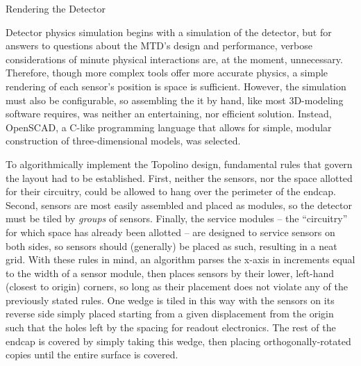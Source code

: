 \begin{section}{Rendering the Detector}

Detector physics simulation begins with a simulation of the detector, but for answers to questions about the MTD's design and performance, verbose considerations of minute physical interactions are, at the moment, unnecessary. Therefore, though more complex tools offer more accurate physics, a simple rendering of each sensor's position is space is sufficient. However, the simulation must also be configurable, so assembling the it by hand, like most 3D-modeling software requires, was neither an entertaining, nor efficient solution. Instead, OpenSCAD, a C-like programming language that allows for simple, modular construction of three-dimensional models, was selected.

To algorithmically implement the Topolino design, fundamental rules that govern the layout had to be established. First, neither the sensors, nor the space allotted for their circuitry, could be allowed to hang over the perimeter of the endcap. Second, sensors are most easily assembled and placed as modules, so the detector must be tiled by \textit{groups} of sensors. Finally, the service modules -- the ``circuitry'' for which space has already been allotted -- are designed to service sensors on both sides, so sensors should (generally) be placed as such, resulting in a neat grid. With these rules in mind, an algorithm parses the x-axis in increments equal to the width of a sensor module, then places sensors by their lower, left-hand (closest to origin) corners, so long as their placement does not violate any of the previously stated rules. One wedge is tiled in this way with the sensors on its reverse side simply placed starting from a given displacement from the origin such that the holes left by the spacing for readout electronics. The rest of the endcap is covered by simply taking this wedge, then placing orthogonally-rotated copies until the entire surface is covered.

\end{section}

